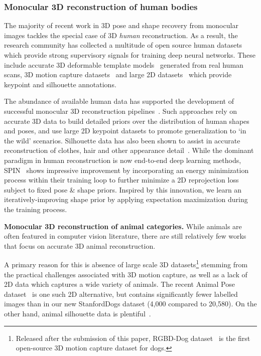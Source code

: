   \subsubsection{Monocular 3D reconstruction of human bodies}
  The majority of recent work in 3D pose and shape recovery from monocular images tackles the special case of 3D \emph{human} reconstruction. As a result, the research community has collected a multitude of open source human datasets which provide strong supervisory signals for training deep neural networks. These include accurate 3D deformable template models~\cite{loper2015smpl} generated from real human scans, 3D motion capture datasets~\cite{ionescu2013human3,vonMarcard2018} and large 2D datasets~\cite{mscoco,Johnson10,andriluka14cvpr} which provide keypoint and silhouette annotations. 
  
  The abundance of available human data has supported the development of successful monocular 3D reconstruction pipelines~\cite{kolotouros19convolutional,hmrKanazawa17}. Such approaches rely on accurate 3D data to build detailed priors over the distribution of human shapes and poses, and use large 2D keypoint datasets to promote generalization to `in the wild' scenarios. Silhouette data has also been shown to assist in accurate reconstruction of clothes, hair and other appearance detail~\cite{pifuSHNMKL19,alldieck2019learning}.
  While the dominant paradigm in human reconstruction is now end-to-end deep learning methods, SPIN~\cite{kolotouros2019learning} shows impressive improvement by incorporating an energy minimization process within their training loop to further minimize a 2D reprojection loss subject to fixed pose \& shape priors. Inspired by this innovation, we learn an iteratively-improving shape prior by applying expectation maximization during the training process.
  
  \textbf{Monocular 3D reconstruction of animal categories.}
  While animals are often featured in computer vision literature, there are still relatively few works that focus on accurate 3D animal reconstruction. 
  
  A primary reason for this is absence of large scale 3D datasets\footnote{Released after the submission of this paper, RGBD-Dog dataset~\cite{Kearney_2020_CVPR} is the first open-source 3D motion capture dataset for dogs.} stemming from the practical challenges associated with 3D motion capture, as well as a lack of 2D data which captures a wide variety of animals. The recent Animal Pose dataset~\cite{animalpose} is one such 2D alternative, but contains significantly fewer labelled images than in our new StanfordDogs dataset (4,000 compared to 20,580). On the other hand, animal silhouette data is plentiful~\cite{mscoco,everingham2010pascal,DAVIS2017-2nd}.
  
